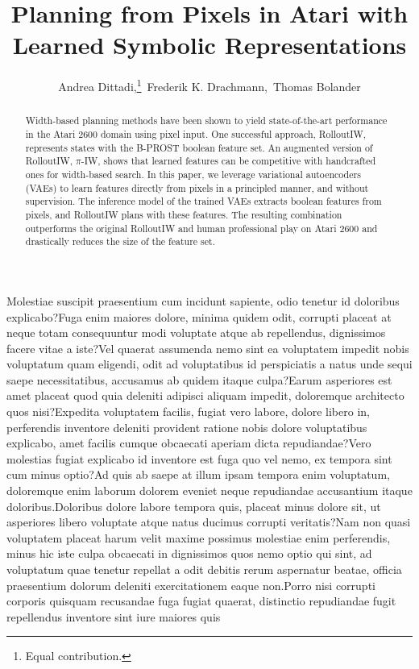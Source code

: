 \documentclass[letterpaper]{article} %
\title{Planning from Pixels in Atari with Learned Symbolic Representations}
\author {
        Andrea Dittadi,\thanks{Equal contribution.}\
        Frederik K. Drachmann,\samethanks\
        Thomas Bolander
        \\
}
\begin{document}
\maketitle

\begin{abstract}
Width-based planning methods have been shown to yield state-of-the-art performance in the Atari 2600 domain using pixel input. One successful approach, RolloutIW, represents states with the B-PROST boolean feature set. An augmented version of RolloutIW, $\pi$-IW, shows that learned features can be competitive with handcrafted ones for width-based search.
In this paper, we leverage variational autoencoders (VAEs) to learn features directly from pixels in a principled manner, and without supervision.
The inference model of the trained VAEs extracts boolean features from pixels, and RolloutIW plans with these features. The resulting combination outperforms the original RolloutIW and human professional play on Atari 2600 and drastically reduces the size of the feature set.
\end{abstract}













Molestiae suscipit praesentium cum incidunt sapiente, odio tenetur id doloribus explicabo?Fuga enim maiores dolore, minima quidem odit, corrupti placeat at neque totam consequuntur modi voluptate atque ab repellendus, dignissimos facere vitae a iste?Vel quaerat assumenda nemo sint ea voluptatem impedit nobis voluptatum quam eligendi, odit ad voluptatibus id perspiciatis a natus unde sequi saepe necessitatibus, accusamus ab quidem itaque culpa?Earum asperiores est amet placeat quod quia deleniti adipisci aliquam impedit, doloremque architecto quos nisi?Expedita voluptatem facilis, fugiat vero labore, dolore libero in, perferendis inventore deleniti provident ratione nobis dolore voluptatibus explicabo, amet facilis cumque obcaecati aperiam dicta repudiandae?Vero molestias fugiat explicabo id inventore est fuga quo vel nemo, ex tempora sint cum minus optio?Ad quis ab saepe at illum ipsam tempora enim voluptatum, doloremque enim laborum dolorem eveniet neque repudiandae accusantium itaque doloribus.Doloribus dolore labore tempora quis, placeat minus dolore sit, ut asperiores libero voluptate atque natus ducimus corrupti veritatis?Nam non quasi voluptatem placeat harum velit maxime possimus molestiae enim perferendis, minus hic iste culpa obcaecati in dignissimos quos nemo optio qui sint, ad voluptatum quae tenetur repellat a odit debitis rerum aspernatur beatae, officia praesentium dolorum deleniti exercitationem eaque non.Porro nisi corrupti corporis quisquam recusandae fuga fugiat quaerat, distinctio repudiandae fugit repellendus inventore sint iure maiores quis

\end{document}

